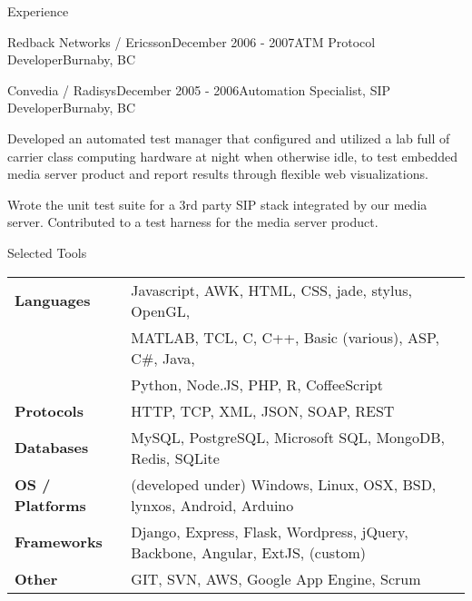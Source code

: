 \documentclass{resume} %
\begin{document}
\begin{rSection}{Experience}
\begin{rSubsection}{Redback Networks / Ericsson}{December 2006 - 2007}{ATM Protocol Developer}{Burnaby, BC}
\end{rSubsection}
\begin{rSubsection}{Convedia / Radisys}{December 2005 - 2006}{Automation Specialist, SIP Developer}{Burnaby, BC}
\item Developed an automated test manager that configured and utilized a lab full of carrier class computing hardware at night when otherwise idle, to test embedded media server product and report results through flexible web visualizations.
\item Wrote the unit test suite for a 3rd party SIP stack integrated by our media server. Contributed to a test harness for the media server product.
\end{rSubsection}

\end{rSection}


\begin{rSection}{Selected Tools}
\begin{tabular}{ @{} >{\bfseries}l @{\hspace{6ex}} l }
Languages & Javascript, AWK, HTML, CSS, jade, stylus, OpenGL, \\
 & MATLAB, TCL, C, C++, Basic (various), ASP, C\#, Java, \\
 & Python, Node.JS, PHP, R, CoffeeScript \\
Protocols & HTTP, TCP, XML, JSON, SOAP, REST \\
Databases & MySQL, PostgreSQL, Microsoft SQL, MongoDB, Redis, SQLite \\
OS / Platforms & (developed under) Windows, Linux, OSX, BSD, lynxos, Android, Arduino \\
Frameworks & Django, Express, Flask, Wordpress, jQuery, Backbone, Angular, ExtJS, (custom) \\
Other & GIT, SVN, AWS, Google App Engine, Scrum \\
\end{tabular}
\end{rSection}

\end{document}
